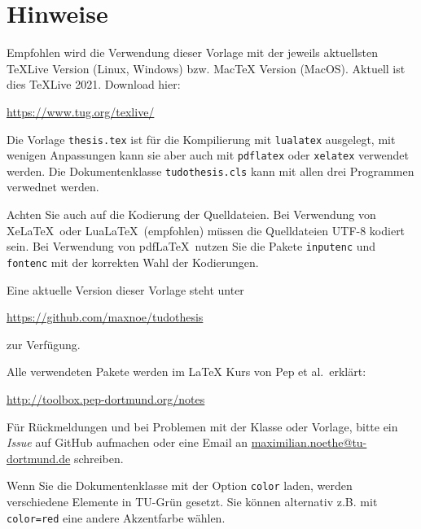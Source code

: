 \thispagestyle{empty}
\setcounter{page}{2}
\section*{Hinweise}
Empfohlen wird die Verwendung dieser Vorlage mit der jeweils aktuellsten TeXLive Version (Linux, Windows) bzw. MacTeX Version (MacOS).
Aktuell ist dies TeXLive 2021. Download hier:
\begin{center}
  \ttfamily\url{https://www.tug.org/texlive/}
\end{center}

Die Vorlage \texttt{thesis.tex} ist für die Kompilierung mit \texttt{lualatex} ausgelegt, mit wenigen Anpassungen kann sie aber auch mit \texttt{pdflatex} oder \texttt{xelatex} verwendet werden.
Die Dokumentenklasse \texttt{tudothesis.cls} kann mit allen drei Programmen verwednet werden.

Achten Sie auch auf die Kodierung der Quelldateien.
Bei Verwendung von Xe\LaTeX\ oder Lua\LaTeX\ (empfohlen) müssen die
Quelldateien UTF-8 kodiert sein.
Bei Verwendung von pdf\LaTeX\ nutzen Sie die Pakete \texttt{inputenc} und \texttt{fontenc} mit der korrekten Wahl der Kodierungen.

Eine aktuelle Version dieser Vorlage steht unter 
\begin{center}
  \ttfamily\url{https://github.com/maxnoe/tudothesis}
\end{center}
zur Verfügung.

Alle verwendeten Pakete werden im \LaTeX{} Kurs von Pep et al.\ erklärt:
\begin{center}
  \ttfamily\url{http://toolbox.pep-dortmund.org/notes}
\end{center}

Für Rückmeldungen und bei Problemen mit der Klasse oder Vorlage, bitte ein \emph{Issue} auf GitHub aufmachen oder eine Email an
\href{mailto:maximilian.noethe@tu-dortmund.de}{maximilian.noethe@tu-dortmund.de} schreiben.

Wenn Sie die Dokumentenklasse mit der Option \texttt{color} laden, werden verschiedene Elemente in TU-Grün gesetzt.
Sie können alternativ z.B. mit \texttt{color=red} eine andere Akzentfarbe wählen.

